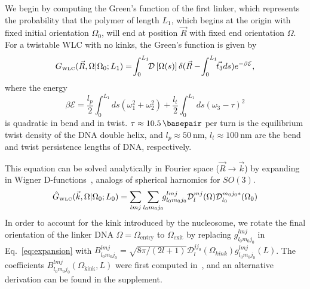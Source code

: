 \documentclass[%
 reprint,
superscriptaddress,
showpacs,preprintnumbers,
 amsmath,amssymb,
 aps,
 prl,
]{revtex4-1}
\newcommand{\gwlc}[2][\Omega_0; L_0]{G_\text{\tiny WLC}(#2|#1)}
\newcommand{\ghat}[2][\Omega_0; L_0]{\hat{G}_\text{\tiny WLC}(#2|#1)}
\newcommand{\greens}[2][\Omega_0; L]{G(#2|#1)}
\newcommand{\pathd}[1]{\mathcal{D}\left[#1\right]}
\newcommand{\energy}{\mathcal{E}}
\newcommand{\wigD}{\mathcal{D}}
\begin{document}
We begin by computing the Green's function of the first linker, which represents
the probability that the polymer of length $L_1$, which begins at
the origin with fixed initial orientation $\Omega_0$, will end at position
$\vec{R}$ with fixed end orientation $\Omega$.
For a twistable WLC with no kinks, the Green's function is given by
\begin{equation}\label{eq:path}
    \gwlc[\Omega_0;L_1]{\vec{R}, \Omega} =\! \int_{0}^{L_1} \!\! \pathd{\Omega(s)}
              \delta(\vec{R} - \!\int_{0}^{L_1} \!\!\vec{t_3} ds)
              e^{-\beta \mathcal{E}},
\end{equation}
    where the energy
\begin{equation}\label{eq:energy}
    \beta\energy = \frac{l_p}{2}\int_{0}^{L_1} ds
    (\omega_1^2 + \omega_2 ^2) + \frac{l_t}{2}\int_{0}^{L_1} ds
    {\left(\omega_3 - \tau\right)}^2
\end{equation}
    is quadratic in bend and in twist. {$\tau \approx \SI{10.5}{\basepair}$}
    per turn is the equilibrium twist density of the DNA double helix, and {$l_p
    \approx \SI{50}{\nano\metre}$}, {$l_t \approx \SI{100}{\nano\metre}$} are
    the bend and twist persistence lengths of DNA, respectively.

This equation can be solved analytically in Fourier space
    ($\vec{R} \rightarrow \vec{k}$) by expanding in Wigner
    D-functions~\cite{spakowitz2006}, analogs of spherical harnomics for
    $SO(3)$.
\begin{equation}\label{eq:expansion}
    \ghat{\vec{k}, \Omega} = \sum_{l m j}\sum_{l_0 m_0 j_0} \!\! g_{l_0 m_0 j_0}^{lmj}
        \wigD_l^{mj}(\Omega)\wigD_{l_0}^{m_0 j_0 *}(\Omega_0)
\end{equation}
In order to account for the kink introduced by the nucleosome, we rotate
    the final orientation of the linker DNA ${\Omega = \Omega_\text{entry}}$ to
    $\Omega_\text{exit}$ by replacing
    $g_{l_0 m_0 j_0}^{lmj}$ in Eq.~\ref{eq:expansion} with $B_{l_{0}m_{0}j_{0}}^{lmj} =
    \sqrt{8\pi/(2l+1)}%
    \mathcal{D}_{l}^{jj_{0}}
    \left(\Omega_{kink}\right)g_{l_{0}m_{0}j_{0}}^{lmj}\left(L\right)$.
The coefficients $B_{l_0 m_0 j_0}^{lmj}(\Omega_\text{kink}, L)$ were first
    computed in~\cite{zhou2003}, and an alternative derivation can be found in
    the supplement.
\end{document}
